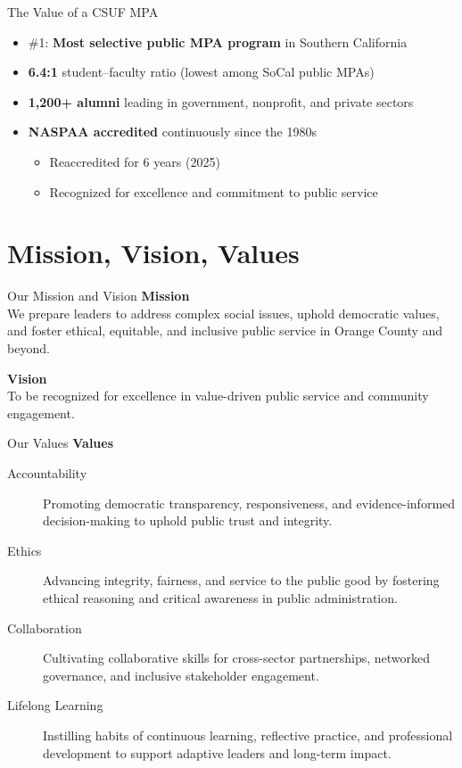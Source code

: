 \documentclass[10pt]{beamer}
\begin{document}
\begin{frame}{The Value of a CSUF MPA}
\begin{Large}
\begin{itemize}
  \item \#1: \textbf{Most selective public MPA program} in Southern California
  \item \textbf{6.4:1} student--faculty ratio (lowest among SoCal public MPAs)
  \item \textbf{1,200+ alumni} leading in government, nonprofit, and private sectors
  \item \textbf{NASPAA accredited} continuously since the 1980s
    \begin{itemize}
      \item Reaccredited for 6 years (2025)
      \item Recognized for excellence and commitment to public service
    \end{itemize}
\end{itemize}
\end{Large}
\end{frame}

\section{\textcolor{titanorange}{Mission, Vision, Values}}

\begin{frame}{Our Mission and Vision}
\textbf{Mission}\\
We prepare leaders to address complex social issues, uphold democratic values, and foster ethical, equitable, and inclusive public service in Orange County and beyond.

\vspace{0.8em}
\textbf{Vision}\\
To be recognized for excellence in value-driven public service and community engagement.
\end{frame}

\begin{frame}{Our Values}
\textbf{Values}
\begin{description}
  \item[Accountability] Promoting democratic transparency, responsiveness, and evidence-informed decision-making to uphold public trust and integrity.
  \item[Ethics] Advancing integrity, fairness, and service to the public good by fostering ethical reasoning and critical awareness in public administration.
  \item[Collaboration] Cultivating collaborative skills for cross-sector partnerships, networked governance, and inclusive stakeholder engagement.
  \item[Lifelong Learning] Instilling habits of continuous learning, reflective practice, and professional development to support adaptive leaders and long-term impact.
\end{description}
\end{frame}
\end{document}
